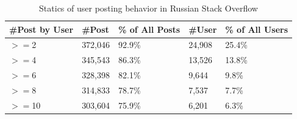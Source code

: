 \begin{table}
	\centering
	\small
	\caption{Statics of user posting behavior in Russian Stack Overflow}
	\label{tab:postnumber}
	\begin{tabular}{lllll}
		\hline
		\textbf{\#Post by User} & \textbf{\#Post} & \textbf{\% of All Posts} & \textbf{\#User} & \textbf{\% of All Users} \\
		\hline
		$>=$2 &372,046&92.9\%&24,908&25.4\%\\
		$>=$4 &345,543&86.3\%&13,526&13.8\%\\
		$>=$6 &328,398&82.1\%&9,644&9.8\%\\
		$>=$8 &314,833&78.7\%&7,537&7.7\%\\
		$>=$10&303,604&75.9\%&6,201&6.3\%\\
		\hline
	\end{tabular}
\end{table}	

